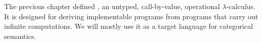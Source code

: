 
\begin{comment}
To this end, we are concurrently developing \targetlang: an untyped, call-by-value $\lambda$-calculus extended with sets as values, and primitive set operators that correspond with the Zermelo-Fraenkel axioms and Choice. Mixing lambdas and sets has been done in automated theorem proving \cite{cit:paulson-1993-settheory-i,cit:paulson-1995-settheory-ii,cit:gordon-1996-holst}; it is possible to define exact real arithmetic, and easy to express infinite set operations and infinite sums.  For this paper, we assume those operations are already defined.  We freely use syntactic sugar like infix, summation, set comprehensions, and pattern-matching definitions. In short, we intend \targetlang to be contemporary mathematics with well-defined lambdas, or a practical $\lambda$-calculus with infinite sets.

For example, $image$ is a \texttt{map}-like primitive set operator corresponding to the replacement axiom schema. If $f$ is a lambda and $A$ is a set, $\appp \image f A\ =\ \setb{\app f x}{x \in A}$ applies $f$ to every element of $A$ and returns the set of results.

Besides lambdas, \targetlang has an another class of applicable values: set-theoretic functions, or \keyword{mappings}. A mapping is just a set of pairs $\seq{x,y}$ where each $x$ is unique. If $g$ is a mapping and $x$ is in its domain, $\app g x$ returns the $y$ for which $\seq{x,y} \in g$. Restricting a lambda $f$ to a domain $A$ returns a mapping:
\begin{equation}
	{f}\restrict{A}
		\ =\ \setb{\seq{x,\app f x}}{x \in A}
		\ =\ \appp \image {(\fun x {\seq{x,\app f x}})} A
\label{eqn:restrict}
\end{equation}
Mappings can also be restricted using \eqref{eqn:restrict}. We often write mappings as $\fun{x \in A} e$ instead of ${(\fun x e)}\restrict{A}$. We think of $\seq{A, f}$ as a \textit{lazy} mapping.

Though \targetlang has no formal type system, we find it helpful to reason about types informally. When we do, $A \tto B$ is a lambda or mapping type, $A \to B$ is the set of total mappings from $A$ to $B$, and a set is a membership proposition.
\end{comment}

The previous chapter defined \lzfclang, an untyped, call-by-value, operational $\lambda$-calculus.
It is designed for deriving implementable programs from programs that carry out infinite computations.
We will mostly use it as a target language for categorical semantics.

